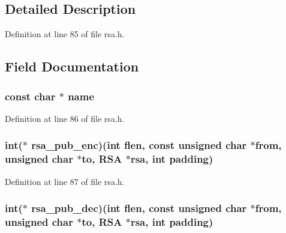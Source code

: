 \subsection{Detailed Description}


Definition at line 85 of file rsa.\+h.



\subsection{Field Documentation}
\subsubsection[{\texorpdfstring{name}{name}}]{\setlength{\rightskip}{0pt plus 5cm}const char $\ast$ name}\hypertarget{structrsa__meth__st_afcd1706c9144e6d6eee6127661ae3be2}{}\label{structrsa__meth__st_afcd1706c9144e6d6eee6127661ae3be2}


Definition at line 86 of file rsa.\+h.

\subsubsection[{\texorpdfstring{rsa\+\_\+pub\+\_\+enc}{rsa_pub_enc}}]{\setlength{\rightskip}{0pt plus 5cm}int($\ast$ rsa\+\_\+pub\+\_\+enc)(int flen, const unsigned char $\ast$from, unsigned char $\ast$to, {\bf R\+SA} $\ast$rsa, int padding)}\hypertarget{structrsa__meth__st_acdaceecccf20cc52eac3d30be6bddd40}{}\label{structrsa__meth__st_acdaceecccf20cc52eac3d30be6bddd40}


Definition at line 87 of file rsa.\+h.

\subsubsection[{\texorpdfstring{rsa\+\_\+pub\+\_\+dec}{rsa_pub_dec}}]{\setlength{\rightskip}{0pt plus 5cm}int($\ast$ rsa\+\_\+pub\+\_\+dec)(int flen, const unsigned char $\ast$from, unsigned char $\ast$to, {\bf R\+SA} $\ast$rsa, int padding)}\hypertarget{structrsa__meth__st_ac1b08f362dd1e4154a35e975861e727e}{}\label{structrsa__meth__st_ac1b08f362dd1e4154a35e975861e727e}


